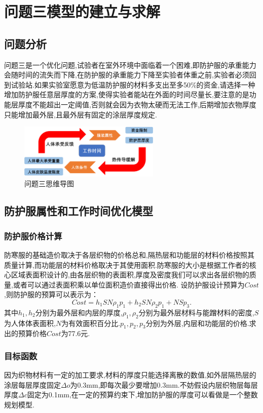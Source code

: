 \documentclass{whutmod}
\begin{document}
\section{问题三模型的建立与求解}
\subsection{问题分析}问题三是一个优化问题,试验者在室外环境中面临着一个困难,即防护服的承重能力会随时间的流失而下降,在防护服的承重能力下降至实验者体重之前,实验者必须回到试验站.如果实验室愿意为低温防护服的材料多支出至多50\%的资金,请选择一种增加防护服任意层厚度的方案,使得实验者能站在外面的时间尽量长,要注意的是功能层厚度不能超出一定阈值,否则就会因为衣物太硬而无法工作,后期增加衣物厚度只能增加最外层,且最外层有固定的涂层厚度规定.

\begin{figure}[!htbp]
	\centering
	\includegraphics[width=0.6\textwidth]{map3.png}
	\caption{问题三思维导图}
\end{figure} 

\newpage
\subsection{防护服属性和工作时间优化模型}

\subsubsection{防护服价格计算}
防寒服的基础造价取决于各层织物的价格总和,隔热层和功能层的材料价格按照其质量计算,而功能层的材料价格取决于其使用面积.防寒服的大小是根据工作者的核心区域表面积设计的,由各层织物的表面积,厚度及密度我们可以求出各层织物的质量,或者可以通过表面积乘以单位面积造价直接得出价格.
设防护服设计预算为$Cost$,则防护服的预算可以表示为：
\begin{equation}
Cost=h_{1}SN\rho_{1}p_{1}+h_{2}SN\rho_{2}p_{1}+NSp_{3}.
\end{equation}
其中$h_{1},h_{2}$分别为最外层和内层的厚度,$\rho_{1},\rho_{2}$分别为最外层材料与能蹭材料的密度,$S$为人体体表面积,$N$为有效面积百分比.$p_{1},p_{2},p_{3}$分别为外层,内层和功能层的价格.求出的预算价格$Cost$为77.6元.


\subsubsection{目标函数}
因为织物材料有一定的加工要求,材料的厚度只能选择离散的数值,如外层隔热层的涂层每层厚度固定$\Delta o$为0.3mm,即每次最少要增加0.3mm.不妨假设内层织物层每层厚度$\Delta c$固定为0.1mm,在一定的预算约束下,增加防护服的厚度可以看做是一个整数规划模型.
\end{document}
